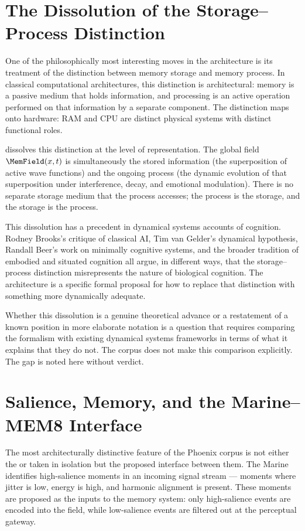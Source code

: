 \section{The Dissolution of the Storage--Process Distinction}
\label{sec:storage-process}

One of the philosophically most interesting moves in the \MEMeight{}
architecture is its treatment of the distinction between memory
storage and memory process. In classical computational architectures,
this distinction is architectural: memory is a passive medium that
holds information, and processing is an active operation performed
on that information by a separate component. The distinction maps
onto hardware: RAM and CPU are distinct physical systems with
distinct functional roles.

\MEMeight{} dissolves this distinction at the level of representation.
The global field $\MemField(x,t)$ is simultaneously the stored
information (the superposition of active wave functions) and the
ongoing process (the dynamic evolution of that superposition under
interference, decay, and emotional modulation). There is no separate
storage medium that the process accesses; the process is the storage,
and the storage is the process.

This dissolution has a precedent in dynamical systems accounts of
cognition. Rodney Brooks's critique of classical AI, Tim van
Gelder's dynamical hypothesis, Randall Beer's work on minimally
cognitive systems, and the broader tradition of embodied and situated
cognition all argue, in different ways, that the storage--process
distinction misrepresents the nature of biological cognition. The
\MEMeight{} architecture is a specific formal proposal for how to
replace that distinction with something more dynamically adequate.

Whether this dissolution is a genuine theoretical advance or a
restatement of a known position in more elaborate notation is a
question that requires comparing the \MEMeight{} formalism with
existing dynamical systems frameworks in terms of what it explains
that they do not. The corpus does not make this comparison
explicitly. The gap is noted here without verdict.

\section{Salience, Memory, and the Marine--MEM\textbar{}8 Interface}
\label{sec:marine-mem8-interface}

The most architecturally distinctive feature of the Phoenix corpus
is not either the \Marine{} or \MEMeight{} taken in isolation but
the proposed interface between them. The Marine identifies
high-salience moments in an incoming signal stream --- moments
where jitter is low, energy is high, and harmonic alignment is
present. These moments are proposed as the inputs to the memory
system: only high-salience events are encoded into the \MEMeight{}
field, while low-salience events are filtered out at the perceptual
gateway.

